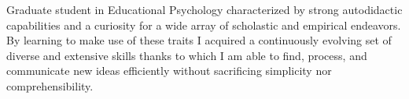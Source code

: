 \begin{minipage}[t]{1\linewidth}
	\vspace{0.25cm}
	Graduate student in Educational Psychology characterized by strong autodidactic capabilities and a curiosity for a wide array of scholastic and empirical endeavors. By learning to make use of these traits I acquired a continuously evolving set of diverse and extensive skills thanks to which I am able to find, process, and communicate new ideas efficiently without sacrificing simplicity nor comprehensibility.  
\end{minipage} 
